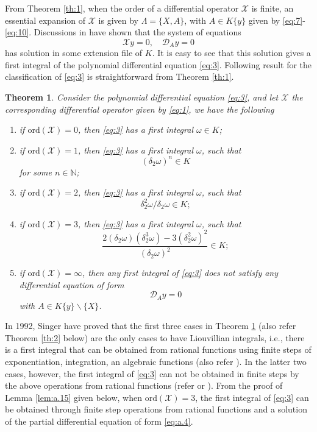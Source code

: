 \documentclass[preprint,12pt]{elsarticle}
\newtheorem{thm}{Theorem}
\begin{document}
From Theorem \ref{th:1}, when the order of a differential operator $\mathscr{X}$ is finite, an essential expansion of $\mathscr{X}$ is given by $\Lambda = \{X,A\}$, with $A\in K\{y\}$ given by \eqref{eq:7}-\eqref{eq:10}. Discussions in \cite[Chapter 2]{Ritt:50} have shown that the system of equations
\begin{equation}
\mathscr{X} y  = 0,\quad \mathscr{D}_A y = 0
\end{equation}
has solution in some extension file of $K$.  It is easy to see that this solution gives a first integral of the polynomial differential equation \eqref{eq:3}. Following result for the classification of \eqref{eq:3} is straightforward from Theorem \ref{th:1}.
\begin{thm}
\label{th:3}
Consider the polynomial differential equation \eqref{eq:3}, and let $\mathscr{X}$  the corresponding  differential operator given by \eqref{eq:1}, we have the following
\begin{enumerate}
\item[(1)] if $\mathrm{ord}(\mathscr{X}) = 0$, then \eqref{eq:3} has a first integral $\omega\in K$;
\item[(2)] if $\mathrm{ord}(\mathscr{X}) = 1$, then \eqref{eq:3} has a first integral $\omega$, such that
$$(\delta_2\omega)^n \in K$$
for some $n\in \mathbb{N}$;
\item[(3)] if $\mathrm{ord}(\mathscr{X}) = 2$, then \eqref{eq:3} has a first integral $\omega$, such that
$$\delta_2^2\omega/\delta_2\omega \in K;$$
\item[(4)] if $\mathrm{ord}(\mathscr{X}) = 3$, then \eqref{eq:3} has a first integral $\omega$, such that
$$\dfrac{2(\delta_2\omega) (\delta_2^3\omega) - 3 (\delta_2^2\omega)^2}{(\delta_2 \omega)^2} \in K;$$
\item[(5)] if $\mathrm{ord}(\mathscr{X}) = \infty$, then any first integral of \eqref{eq:3} does not satisfy any differential equation of form
$$\mathscr{D}_Ay =0$$
with $A\in K\{y\}\backslash\{X\}$.
\end{enumerate}
\end{thm}

In 1992, Singer have proved that the first three cases in Theorem \ref{th:3} (also refer Theorem \ref{th:2} below) are the only cases to have  Liouvillian integrals, i.e., there is a first integral that can be obtained from rational functions using finite steps of exponentiation, integration, an algebraic functions \cite{Singer:92}(also refer \cite{Guan:02}).  In the latter two cases,  however, the first integral of \eqref{eq:3} can not be obtained in finite steps  by the above operations from rational functions (refer \cite{Singer:92} or \cite{Guan:02}).  From the proof of Lemma \ref{lem:a.15} given below, when $\mathrm{ord}(\mathscr{X}) = 3$, the first integral of \eqref{eq:3} can be obtained through finite step operations from rational functions and a solution of the partial differential equation of form \eqref{eq:a.4}.
\end{document}
